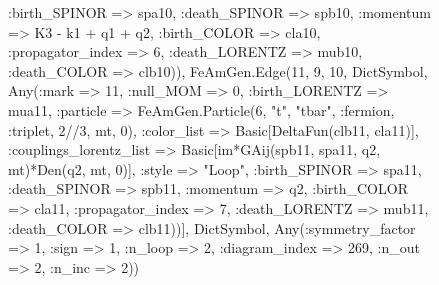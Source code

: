 \documentclass{revtex4}
\begin{document}
\begin{figure}[!htb]
\begin{center}
{:birth_SPINOR => spa10, :death_SPINOR => spb10, :momentum => K3 - k1 + q1 + q2, :birth_COLOR => cla10, :propagator_index => 6, :death_LORENTZ => mub10, :death_COLOR => clb10)), FeAmGen.Edge(11, 9, 10, Dict{Symbol, Any}(:mark => 11, :null_MOM => 0, :birth_LORENTZ => mua11, :particle => FeAmGen.Particle(6, "t", "tbar", :fermion, :triplet, 2//3, mt, 0), :color_list => Basic[DeltaFun(clb11, cla11)], :couplings_lorentz_list => Basic[im*GAij(spb11, spa11, q2, mt)*Den(q2, mt, 0)], :style => "Loop", :birth_SPINOR => spa11, :death_SPINOR => spb11, :momentum => q2, :birth_COLOR => cla11, :propagator_index => 7, :death_LORENTZ => mub11, :death_COLOR => clb11))], Dict{Symbol, Any}(:symmetry_factor => 1, :sign => 1, :n_loop => 2, :diagram_index => 269, :n_out => 2, :n_inc => 2)) 
}
\end{center}
\end{figure}
\end{document}
